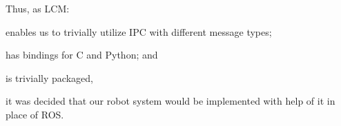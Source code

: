 Thus, as LCM:
\begin{inline-enum}
\item enables us to trivially utilize IPC with different message types;
\item has bindings for C and Python; and
\item is trivially packaged,
\end{inline-enum}
it was decided that our robot system would be implemented with help of it in place of ROS.
